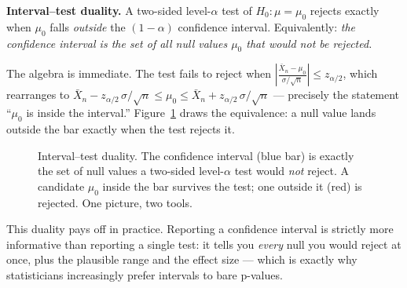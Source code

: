 \begin{focusbox}
\textbf{Interval--test duality.} A two-sided level-$\alpha$ test of $H_0\!:\mu=\mu_0$
rejects exactly when $\mu_0$ falls \emph{outside} the $(1-\alpha)$ confidence interval.
Equivalently: \emph{the confidence interval is the set of all null values $\mu_0$ that
would not be rejected.}
\end{focusbox}

The algebra is immediate. The test fails to reject when
$\left|\frac{\bar X_n - \mu_0}{\sigma/\sqrt n}\right| \le z_{\alpha/2}$, which rearranges
to $\bar X_n - z_{\alpha/2}\,\sigma/\sqrt n \le \mu_0 \le \bar X_n + z_{\alpha/2}\,
\sigma/\sqrt n$ --- precisely the statement ``$\mu_0$ is inside the interval.''
Figure~\ref{ch32:fig-duality} draws the equivalence: a null value lands outside the bar
exactly when the test rejects it.

\begin{figure}[H]
\centering
{}
\caption{Interval--test duality. The confidence interval (blue bar) is exactly the set
of null values a two-sided level-$\alpha$ test would \emph{not} reject. A candidate
$\mu_0$ inside the bar survives the test; one outside it (red) is rejected. One picture,
two tools.}
\label{ch32:fig-duality}
\end{figure}

This duality pays off in practice. Reporting a confidence interval is strictly more
informative than reporting a single test: it tells you \emph{every} null you would
reject at once, plus the plausible range and the effect size --- which is exactly why
statisticians increasingly prefer intervals to bare p-values.

